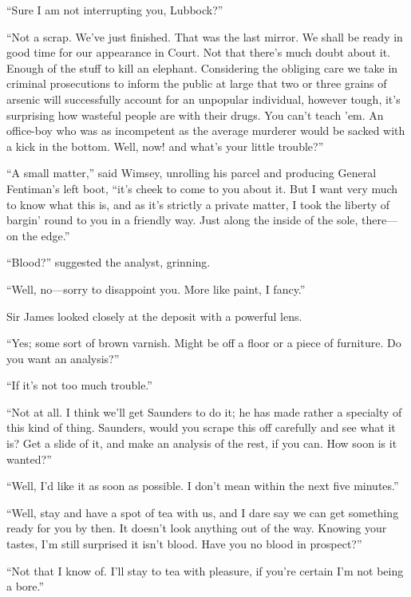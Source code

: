 \enquote{Sure I am not interrupting you, Lubbock?}

\enquote{Not a scrap. We've just finished. That was the last mirror. We shall be ready in good time for our appearance in Court. Not that there's much doubt about it. Enough of the stuff to kill an elephant. Considering the obliging care we take in criminal prosecutions to inform the public at large that two or three grains of arsenic will successfully account for an unpopular individual, however tough, it's surprising how wasteful people are with their drugs. You can't teach 'em. An office-boy who was as incompetent as the average murderer would be sacked with a kick in the bottom. Well, now! and what's your little trouble?}

\enquote{A small matter,} said Wimsey, unrolling his parcel and producing General Fentiman's left boot, \enquote{it's cheek to come to you about it. But I want very much to know what this is, and as it's strictly a private matter, I took the liberty of bargin' round to you in a friendly way. Just along the inside of the sole, there\allowbreak---\allowbreak on the edge.}

\enquote{Blood?} suggested the analyst, grinning.

\enquote{Well, no\allowbreak---\allowbreak sorry to disappoint you. More like paint, I fancy.}

Sir James looked closely at the deposit with a powerful lens.

\enquote{Yes; some sort of brown varnish. Might be off a floor or a piece of furniture. Do you want an analysis?}

\enquote{If it's not too much trouble.}

\enquote{Not at all. I think we'll get Saunders to do it; he has made rather a specialty of this kind of thing. Saunders, would you scrape this off carefully and see what it is? Get a slide of it, and make an analysis of the rest, if you can. How soon is it wanted?}

\enquote{Well, I'd like it as soon as possible. I don't mean within the next five minutes.}

\enquote{Well, stay and have a spot of tea with us, and I dare say we can get something ready for you by then. It doesn't look anything out of the way. Knowing your tastes, I'm still surprised it isn't blood. Have you no blood in prospect?}

\enquote{Not that I know of. I'll stay to tea with pleasure, if you're certain I'm not being a bore.}

